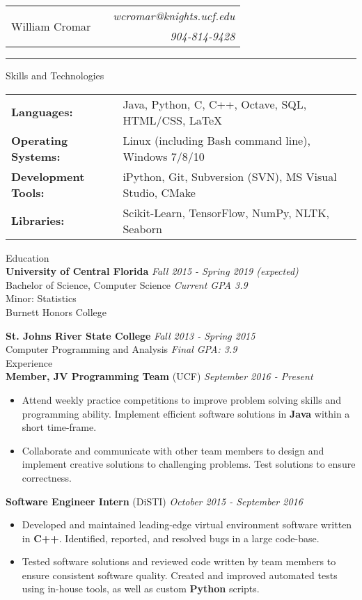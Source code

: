 \documentclass[letterpaper,11pt,oneside]{article}
\newcommand{\mkheader}[3]{
  {\fontfamily{pag}\selectfont
  \begin{tabularx}{\textwidth}{lXr}
    \multirow{2}{*}{\Huge #1} && \emph{#2}
    \\ && \emph{#3}
  \end{tabularx}
  }
  \vspace{2pt}
  \hrule
}
\newcommand{\resheader}[2][]{
  \vspace{9pt}
  {\LARGE #2} #1
  \\
}
\newcommand{\ressubheader}[3][]{
  \vspace{6pt}
  {\large \textbf{#2} #1} \hfill \emph{#3}
  \\
}
\newcommand{\resskill}[1]{\textbf{#1}}
\begin{document}
\mkheader{William Cromar}{wcromar@knights.ucf.edu}{904-814-9428}

\resheader{Skills and Technologies}
\vspace{6pt}
\begin{tabular}{>{\bfseries}l@{\hskip .25cm} l}
  Languages: & Java, Python, C, C++, Octave, SQL, HTML/CSS, LaTeX \\
  Operating Systems: & Linux (including Bash command line), Windows 7/8/10 \\
  Development Tools: & iPython, Git, Subversion (SVN), MS Visual Studio, CMake \\
  Libraries: & Scikit-Learn, TensorFlow, NumPy, NLTK, Seaborn
\end{tabular}


\resheader{Education}
\ressubheader{University of Central Florida}{Fall 2015 - Spring 2019 (expected)}
Bachelor of Science, Computer Science \hfill \emph{Current GPA 3.9} \\
Minor: Statistics \\
Burnett Honors College

\ressubheader{St. Johns River State College}{Fall 2013 - Spring 2015}
Computer Programming and Analysis \hfill \emph{Final GPA: 3.9} \\

\resheader{Experience}
\ressubheader[(UCF)]{Member, JV Programming Team}{September 2016 - Present}
\begin{itemize}
  \item Attend weekly practice competitions to improve problem solving skills
    and programming ability. Implement efficient software solutions in
    \resskill{Java} within a short time-frame. 
  \item Collaborate and communicate with other team members to design and
    implement creative solutions to challenging problems. Test solutions to
    ensure correctness.
\end{itemize}

\ressubheader[(DiSTI)]{Software Engineer Intern}{October 2015 - September 2016}
\begin{itemize}
  \item Developed and maintained leading-edge virtual environment software
    written in \resskill{C++}. Identified, reported, and resolved bugs in a
    large code-base.
  \item Tested software solutions and reviewed code written by team members to
    ensure consistent software quality. Created and improved automated tests
    using in-house tools, as well as custom \resskill{Python} scripts.
\end{itemize}
\end{document}
